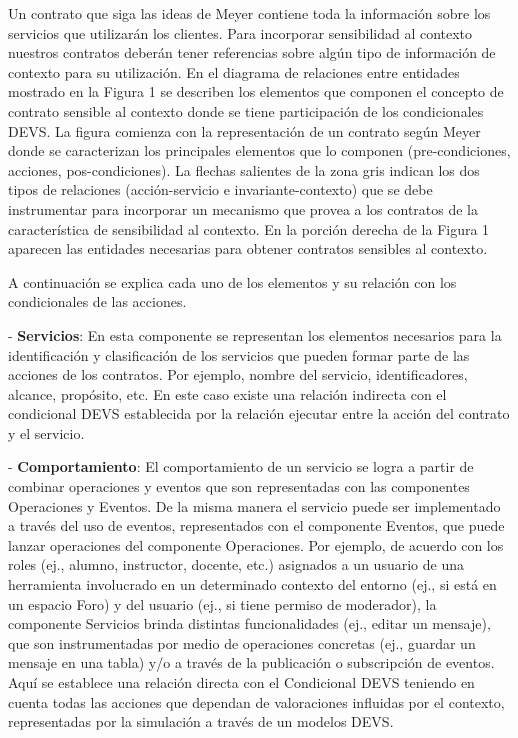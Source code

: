 Un contrato que siga las ideas de Meyer contiene toda la información sobre los
servicios que utilizarán los clientes. Para incorporar sensibilidad al contexto
nuestros contratos deberán tener referencias sobre algún tipo de información de
contexto para su utilización. En el diagrama de relaciones entre entidades
mostrado en la Figura 1 se describen los elementos que componen el concepto de
contrato sensible al contexto donde se tiene participación de los condicionales
DEVS. La figura comienza con la representación de un contrato según Meyer donde
se caracterizan los principales elementos que lo componen (pre-condiciones,
acciones, pos-condiciones). La flechas salientes de la zona gris indican los dos
tipos de relaciones (acción-servicio e invariante-contexto) que se debe
instrumentar para incorporar un mecanismo que provea a los contratos de la
característica de sensibilidad al contexto. En la porción derecha de la Figura 1
aparecen las entidades necesarias para obtener contratos sensibles al contexto.

A continuación se explica cada uno de los elementos y su relación con los
condicionales de las acciones.

- \textbf{Servicios}: En esta componente se representan los elementos necesarios
para la identificación y clasificación de los servicios que pueden formar parte
de las acciones de los contratos. Por ejemplo, nombre del servicio,
identificadores, alcance, propósito, etc. En este caso existe una relación
indirecta con el condicional DEVS establecida por la relación ejecutar entre la
acción del contrato y el servicio. 

- \textbf{Comportamiento}: El comportamiento de un servicio se logra a partir de
combinar operaciones y eventos que son representadas con las componentes
Operaciones y Eventos. De la misma manera el servicio puede ser implementado a
través del uso de eventos, representados con el componente Eventos, que puede
lanzar operaciones del componente Operaciones. Por ejemplo, de acuerdo con los
roles (ej., alumno, instructor, docente, etc.) asignados a un usuario de una
herramienta involucrado en un determinado contexto del entorno (ej., si está en
un espacio Foro) y del usuario (ej., si tiene permiso de moderador), la
componente Servicios brinda distintas funcionalidades (ej., editar un mensaje),
que son instrumentadas por medio de operaciones concretas (ej., guardar un
mensaje en una tabla) y/o a través de la publicación o subscripción de eventos.
Aquí se establece una relación directa con el Condicional DEVS teniendo en
cuenta todas las acciones que dependan de valoraciones influidas por el
contexto, representadas por la simulación a través de un modelos DEVS.

